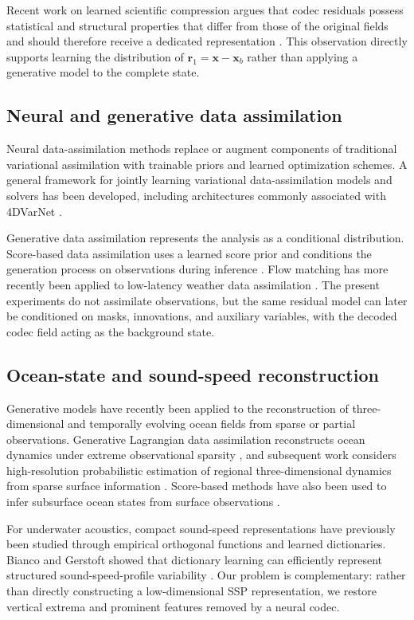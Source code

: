 \documentclass[11pt]{article}
\newcommand{\x}{\mathbf{x}}
\newcommand{\xb}{\mathbf{x}_{b}}
\newcommand{\rone}{\mathbf{r}_{1}}
\begin{document}
Recent work on learned scientific compression argues that codec residuals possess statistical and structural properties that differ from those of the original fields and should therefore receive a dedicated representation \cite{zhu2026residual}. This observation directly supports learning the distribution of $\rone=\x-\xb$ rather than applying a generative model to the complete state.

\subsection{Neural and generative data assimilation}

Neural data-assimilation methods replace or augment components of traditional variational assimilation with trainable priors and learned optimization schemes. A general framework for jointly learning variational data-assimilation models and solvers has been developed, including architectures commonly associated with 4DVarNet \cite{fablet2021learning}.

Generative data assimilation represents the analysis as a conditional distribution. Score-based data assimilation uses a learned score prior and conditions the generation process on observations during inference \cite{rozet2023score}. Flow matching has more recently been applied to low-latency weather data assimilation \cite{cheng2026flowda}. The present experiments do not assimilate observations, but the same residual model can later be conditioned on masks, innovations, and auxiliary variables, with the decoded codec field acting as the background state.

\subsection{Ocean-state and sound-speed reconstruction}

Generative models have recently been applied to the reconstruction of three-dimensional and temporally evolving ocean fields from sparse or partial observations. Generative Lagrangian data assimilation reconstructs ocean dynamics under extreme observational sparsity \cite{asefi2025generative}, and subsequent work considers high-resolution probabilistic estimation of regional three-dimensional dynamics from sparse surface information \cite{asefi2026high}. Score-based methods have also been used to infer subsurface ocean states from surface observations \cite{souza2025surface}.

For underwater acoustics, compact sound-speed representations have previously been studied through empirical orthogonal functions and learned dictionaries. Bianco and Gerstoft showed that dictionary learning can efficiently represent structured sound-speed-profile variability \cite{bianco2017dictionary}. Our problem is complementary: rather than directly constructing a low-dimensional SSP representation, we restore vertical extrema and prominent features removed by a neural codec.
\end{document}
